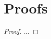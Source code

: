\documentclass{article}
\begin{document}




\appendix
\section{Proofs}

\misevarbound
%
\begin{proof}
	...
\end{proof}

\end{document}
